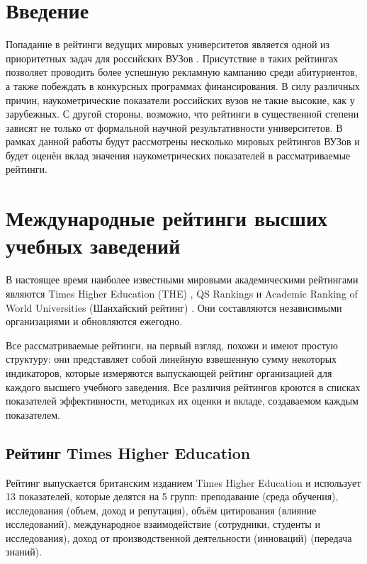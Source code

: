 \section{Введение}

Попадание в рейтинги ведущих мировых университетов является одной из приоритетных
задач для российских ВУЗов \cite{pr5100, unn_strategy}. Присутствие в таких рейтингах позволяет
проводить более успешную рекламную кампанию среди абитуриентов, а также
побеждать в конкурсных программах финансирования. В силу различных причин,
наукометрические показатели российских вузов не такие высокие, как у зарубежных.
С другой стороны, возможно, что рейтинги в существенной степени зависят не только
от формальной научной результативности университетов. В рамках данной
работы будут рассмотрены несколько мировых рейтингов ВУЗов и будет оценён
вклад значения наукометрических показателей в рассматриваемые рейтинги.

\section{Международные рейтинги высших учебных заведений}

В настоящее время наиболее известными мировыми академическими рейтингами
являются Times Higher Education (THE) \cite{the_met}, QS Rankings \cite{qs_met}
и Academic Ranking of World Universities (Шанхайский рейтинг) \cite{arwu_met}.
Они составляются независимыми организациями и обновляются ежегодно.

Все рассматриваемые рейтинги, на первый взгляд, похожи и имеют простую структуру:
они представляет собой линейную взвешенную сумму некоторых индикаторов, которые
измеряются выпускающей рейтинг организацией для каждого высшего учебного заведения.
Все различия рейтингов кроются в списках показателей эффективности, методиках их оценки
и вкладе, создаваемом каждым показателем.

\subsection{Рейтинг Times Higher Education}

Рейтинг выпускается британским изданием Times Higher Education и
использует 13 показателей, которые делятся на 5 групп: преподавание
(среда обучения), исследования (объем, доход и репутация), объём цитирования (влияние исследований),
международное взаимодействие (сотрудники, студенты и исследования), доход от производственной
деятельности (инноваций) (передача знаний).

